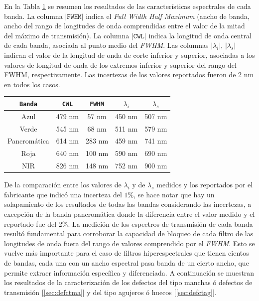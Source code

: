 En la Tabla \ref{tabespc} se resumen los resultados de las características espectrales de cada banda. La columna  $|\texttt{FWHM}|$ indica el \textit{Full Width Half Maximum} (ancho de banda, ancho del rango de longitudes de onda comprendidas entre el valor de la mitad del máximo de transmisión). La columna $|\texttt{CWL}|$ indica la longitud de onda central de cada banda, asociada al punto medio del \textit{FWHM}. Las columnas $|\texttt{$\lambda_{i}$}|$, $|\texttt{$\lambda_{s}$}|$ indican el valor de la longitud de onda de corte inferior y superior, asociadas a los valores de longitud de onda de los extremos inferior y superior del rango del FWHM, respectivamente. Las incertezas de los valores reportados fueron de 2 nm en todos los casos.

 \begin{table}[H]
\begin{center}
\begin{tabular}{ |c|c|c|c|c| }    \toprule
\texttt{Banda} & \texttt{CWL} & \texttt{FWHM} & \texttt{$\lambda_{i}$} & \texttt{$\lambda_{s}$}\\\midrule
\rowcolor{blue!15} Azul    & 479 nm & 57 nm & 450 nm & 507 nm  \\ 
\rowcolor{green!50} Verde  & 545 nm & 68 nm & 511 nm & 579 nm\\ 
Pancromática& 614 nm & 283 nm & 459 nm & 741 nm\\
\rowcolor{red!50} Roja & 640 nm & 100 nm  & 590 nm  & 690 nm\\
\rowcolor{maroon!20} NIR & 826 nm & 148 nm  &  752 nm & 900 nm\\
\bottomrule
 \hline
\end{tabular}
\end{center}
 \label{tabespc}
 \end{table}
De la comparación entre los valores de $\lambda_{i}$ y de $\lambda_{s}$ medidos y los reportados por el fabricante que indicó una incerteza del $1\%$, se hace notar que hay un solapamiento de los resultados de todas las bandas considerando las incertezas, a excepción de la banda pancromática donde la diferencia entre el valor medido y el reportado fue del $2\%$.
La medición de los espectros de transmisión de cada banda resultó fundamental para corroborar la capacidad de bloqueo de cada filtro de las longitudes de onda fuera del rango de valores comprendido por el \textit{FWHM}. Esto se vuelve más importante para el caso de filtros hiperespectrales que tienen cientos de bandas, cada una con un ancho espectral pasa banda de un cierto ancho, que permite extraer información específica y diferenciada. A continuación se muestran los resultados de la caracterización de los defectos del tipo manchas ó defectos de transmisión [\ref{sec:defctma}] y del tipo agujeros ó huecos [\ref{sec:defctag}].



